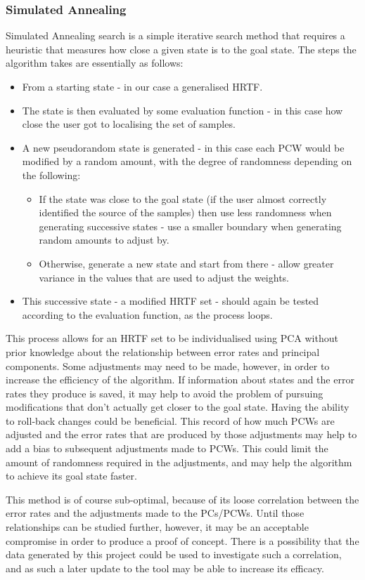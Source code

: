 \subsubsection{Simulated Annealing}
Simulated Annealing \citep{vanLaarhoven1987} search is a simple iterative search method that requires a heuristic that measures how close a given state is to the goal state. The steps the algorithm takes are essentially as follows:
\begin{itemize}
\item From a starting state - in our case a generalised HRTF.
\item The state is then evaluated by some evaluation function - in this case how close the user got to localising the set of samples.
\item A new pseudorandom state is generated - in this case each PCW would be modified by a random amount, with the degree of randomness depending on the following:
\begin{itemize}
\item If the state was close to the goal state (if the user almost correctly identified the source of the samples) then use less randomness when generating successive states - use a smaller boundary when generating random amounts to adjust by.
\item Otherwise, generate a new state and start from there - allow greater variance in the values that are used to adjust the weights. 
\end{itemize}
\item This successive state - a modified HRTF set - should again be tested according to the evaluation function, as the process loops. 
\end{itemize}

This process allows for an HRTF set to be individualised using PCA without prior knowledge about the relationship between error rates and principal components. Some adjustments may need to be made, however, in order to increase the efficiency of the algorithm. If information about states and the error rates they produce is saved, it may help to avoid the problem of pursuing modifications that don't actually get closer to the goal state. Having the ability to roll-back changes could be beneficial. This record of how much PCWs are adjusted and the error rates that are produced by those adjustments may help to add a bias to subsequent adjustments made to PCWs. This could limit the amount of randomness required in the adjustments, and may help the algorithm to achieve its goal state faster. 

This method is of course sub-optimal, because of its loose correlation between the error rates and the adjustments made to the PCs/PCWs. Until those relationships can be studied further, however, it may be an acceptable compromise in order to produce a proof of concept. There is a possibility that the data generated by this project could be used to investigate such a correlation, and as such a later update to the tool may be able to increase its efficacy. 